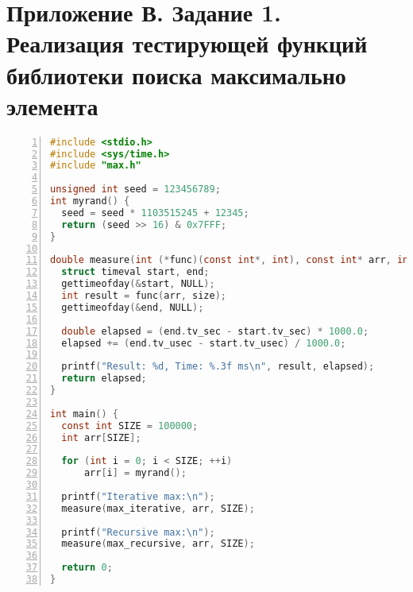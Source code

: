 \section*{Приложение В. Задание 1. Реализация тестирующей функций библиотеки поиска максимально элемента}

\begin{lstlisting}[language=C,numbers=left]
#include <stdio.h>
#include <sys/time.h>
#include "max.h"

unsigned int seed = 123456789;
int myrand() {
  seed = seed * 1103515245 + 12345;
  return (seed >> 16) & 0x7FFF;
}

double measure(int (*func)(const int*, int), const int* arr, int size) {
  struct timeval start, end;
  gettimeofday(&start, NULL);
  int result = func(arr, size);
  gettimeofday(&end, NULL);

  double elapsed = (end.tv_sec - start.tv_sec) * 1000.0;
  elapsed += (end.tv_usec - start.tv_usec) / 1000.0;

  printf("Result: %d, Time: %.3f ms\n", result, elapsed);
  return elapsed;
}

int main() {
  const int SIZE = 100000;
  int arr[SIZE];

  for (int i = 0; i < SIZE; ++i)
      arr[i] = myrand();

  printf("Iterative max:\n");
  measure(max_iterative, arr, SIZE);

  printf("Recursive max:\n");
  measure(max_recursive, arr, SIZE);

  return 0;
}
\end{lstlisting}
